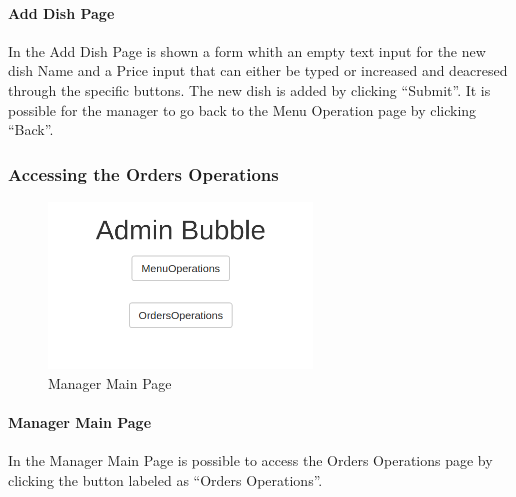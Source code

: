 \paragraph{Add Dish Page}
In the Add Dish Page is shown a form whith an empty text input for the new dish  Name and a Price input that can either be typed or increased and deacresed through the specific buttons. The new dish is added by clicking ``Submit''.
It is possible for the manager to go back to the Menu Operation page by clicking ``Back''.

\subsubsection{Accessing the Orders Operations}
\begin{figure}[H]
	\centering
	\includegraphics[width=7cm]{../../documenti/UserManualDemo/demo_screens/admin_main.png}
	\caption{Manager Main Page}
\end{figure}
\paragraph{Manager Main Page}
In the Manager Main Page is possible to access the Orders Operations page by clicking the button labeled as ``Orders Operations''.
